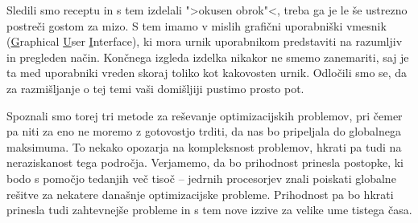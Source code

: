 \documentclass[a4paper, 10pt]{article}
\begin{document}
Sledili smo receptu in s tem izdelali ">okusen obrok"<, treba ga je le še ustrezno postreči
gostom za mizo. S tem imamo v mislih grafični uporabniški vmesnik (\underline{G}raphical
\underline{U}ser \underline{I}nterface), ki mora urnik uporabnikom predstaviti na razumljiv in
pregleden način. Končnega izgleda izdelka nikakor ne smemo zanemariti, saj je ta med uporabniki
vreden skoraj toliko kot kakovosten urnik. Odločili smo se, da za razmišljanje o tej temi vaši
domišljiji pustimo prosto pot.

Spoznali smo torej tri metode za reševanje optimizacijskih problemov, pri čemer pa niti za eno
ne moremo z gotovostjo trditi, da nas bo pripeljala do globalnega maksimuma. To nekako opozarja
na kompleksnost problemov, hkrati pa tudi na neraziskanost tega področja. Verjamemo, da bo
prihodnost prinesla postopke, ki bodo s pomočjo tedanjih več tisoč -- jedrnih procesorjev znali
poiskati globalne rešitve za nekatere današnje optimizacijske probleme. Prihodnost pa bo
hkrati prinesla tudi zahtevnejše probleme in s tem nove izzive za velike ume tistega časa.
\end{document}
